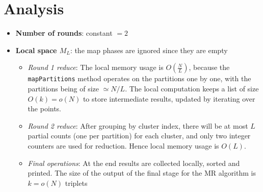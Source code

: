 \documentclass[11pt,letterpaper, onecolumn]{exam}
\begin{document}
\section{Analysis}
\begin{itemize}
    \item \textbf{Number of rounds}: constant $= 2$
    \item \textbf{Local space $M_L$}:
    the map phases are ignored since they are empty
    \begin{itemize}
        \item \textit{Round 1 reduce}: The local memory usage is $O(\frac{N}{L})$, because the \texttt{mapPartitions} method operates on the partitions one by one, with the partitions being of size $\simeq N/L$. The local computation keeps a list of size $O(k) = o(N)$ to store intermediate results, updated by iterating over the points.
        \item \textit{Round 2 reduce}: After grouping by cluster index, there will be at most $L$ partial counts (one per partition) for each cluster, and only two integer counters are used for reduction. Hence local memory usage is $O(L)$.
        \item \textit{Final operations}: At the end results are collected locally, sorted and printed. The size of the output of the final stage for the MR algorithm is $k = o(N)$ triplets
    \end{itemize}
\end{itemize}
\end{document}
